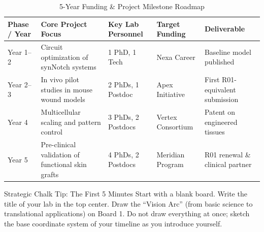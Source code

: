 \begin{table}[h]
\centering
\caption{5-Year Funding \& Project Milestone Roadmap}
\label{tab:timeline}
\begin{tabularx}{\textwidth}{@{}l X l l X@{}}
\toprule
\textbf{Phase / Year} & \textbf{Core Project Focus} & \textbf{Key Lab Personnel} & \textbf{Target Funding} & \textbf{Deliverable} \\ \midrule
Year 1--2 & Circuit optimization of synNotch systems & 1 PhD, 1 Tech & Nexa Career & Baseline model published \\ \addlinespace
Year 2--3 & In vivo pilot studies in mouse wound models & 2 PhDs, 1 Postdoc & Apex Initiative & First R01-equivalent submission \\ \addlinespace
Year 4 & Multicellular scaling and pattern control & 3 PhDs, 2 Postdocs & Vertex Consortium & Patent on engineered tissues \\ \addlinespace
Year 5 & Pre-clinical validation of functional skin grafts & 4 PhDs, 2 Postdocs & Meridian Program & R01 renewal \& clinical partner \\ \bottomrule
\end{tabularx}
\end{table}

\begin{infobox}{Strategic Chalk Tip: The First 5 Minutes}
Start with a blank board. Write the title of your lab in the top center. Draw the ``Vision Arc'' (from basic science to translational applications) on Board 1. Do not draw everything at once; sketch the base coordinate system of your timeline as you introduce yourself.
\end{infobox}
